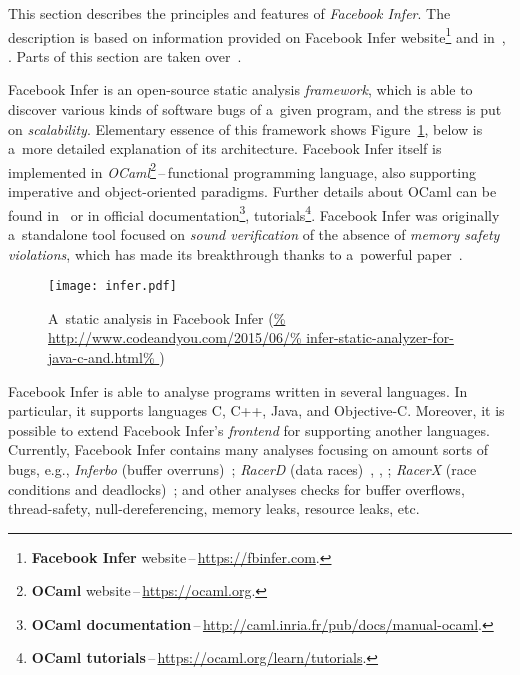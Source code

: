 This section describes the principles and features of
\emph{Facebook Infer}. The description is based on information provided
on Facebook Infer website\footnote{\textbf{Facebook Infer}
website\,--\,\url{https://fbinfer.com}.} and in~\cite{inferAISlides},
\cite{projectPracticeMarcin2018}. Parts of this section are taken
over~\cite{excel2019FBInfer}.

Facebook Infer is an open-source static analysis \emph{framework},
which is able to discover various kinds of software bugs of a~given
program, and the stress is put on \emph{scalability}.
Elementary essence of this framework shows Figure~\ref{fig:infer}, below
is a~more detailed explanation of its architecture. Facebook Infer
itself is implemented in \emph{OCaml}\footnote{\textbf{OCaml}
website\,--\,\url{https://ocaml.org}.}\,--\,functional programming
language, also supporting imperative and object-oriented paradigms. Further
details about OCaml can be found in~\cite{realWorldOCaml} or in
official documentation\footnote{\textbf{OCaml
documentation}\,--\,\url{http://caml.inria.fr/pub/docs/manual-ocaml}.},
tutorials\footnote{\textbf{OCaml
tutorials}\,--\,\url{https://ocaml.org/learn/tutorials}.}. Facebook Infer was
originally a~standalone tool focused on \emph{sound verification} of
the absence of \emph{memory safety violations}, which has made its breakthrough
thanks to a~powerful paper~\cite{inferBiabduction}.

\begin{figure}[hbt]
    \centering
    \texttt{[image: infer.pdf]}
    \caption{%
        A~static analysis in Facebook Infer
        (\url{%
            http://www.codeandyou.com/2015/06/%
            infer-static-analyzer-for-java-c-and.html%
        })
    }
    \label{fig:infer}
\end{figure}

Facebook Infer is able to analyse programs written in several languages.
In particular, it supports languages C, C++, Java, and Objective-C. Moreover,
it is possible to extend Facebook Infer's \emph{frontend} for supporting
another languages. Currently, Facebook Infer contains many analyses focusing
on amount sorts of bugs, e.g., \emph{Inferbo} (buffer
overruns)~\cite{inferboOnline}; \emph{RacerD} (data races)~\cite{racerD},
\cite{racerDOnline}, \cite{staticRaceDetectorTruePositive}; \emph{RacerX}
(race conditions and deadlocks)~\cite{racerX}; and other analyses checks
for buffer overflows, thread-safety, null-dereferencing, memory leaks,
resource leaks, etc.


